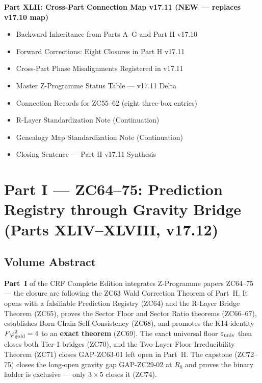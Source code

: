 \documentclass[11pt, a4paper]{article}
\begin{document}
\begin{contentsbox}[title={Part H v17.11 --- Part and Section Headers}]
\textbf{Part XLII: Cross-Part Connection Map v17.11
  (NEW --- replaces v17.10 map)}
\begin{itemize}[noitemsep,leftmargin=1.5em]
  \item Backward Inheritance from Parts A--G and Part H v17.10
  \item Forward Corrections: Eight Closures in Part H v17.11
  \item Cross-Part Phase Misalignments Registered in v17.11
  \item Master Z-Programme Status Table --- v17.11 Delta
  \item Connection Records for ZC55--62 (eight three-box entries)
  \item R-Layer Standardization Note (Continuation)
  \item Genealogy Map Standardization Note (Continuation)
  \item Closing Sentence --- Part H v17.11 Synthesis
\end{itemize}
\end{contentsbox}



\section{Part I --- ZC64--75: Prediction Registry through Gravity Bridge
  (Parts XLIV--XLVIII, v17.12)}

\subsection*{Volume Abstract}

\noindent
\textbf{Part~I} of the CRF Complete Edition integrates Z-Programme
papers ZC64--75 --- the closure arc following the ZC63 Wald Correction
Theorem of Part~H. It opens with a falsifiable Prediction Registry
(ZC64) and the R-Layer Bridge Theorem (ZC65), proves the Sector Floor
and Sector Ratio theorems (ZC66--67), establishes Born-Chain
Self-Consistency (ZC68), and promotes the K14 identity
$F\varphi_{\rm gold}^2 = 4$ to an \textbf{exact theorem} (ZC69). The
exact universal floor $\varepsilon_{\rm univ}$ then closes both Tier-1
bridges (ZC70), and the Two-Layer Floor Irreducibility Theorem (ZC71)
closes GAP-ZC63-01 left open in Part~H. The capstone (ZC72--75) closes
the long-open gravity gap GAP-ZC29-02 at $R_0$ and proves the binary
ladder is exclusive --- only $3\times5$ closes it (ZC74).
\end{document}
